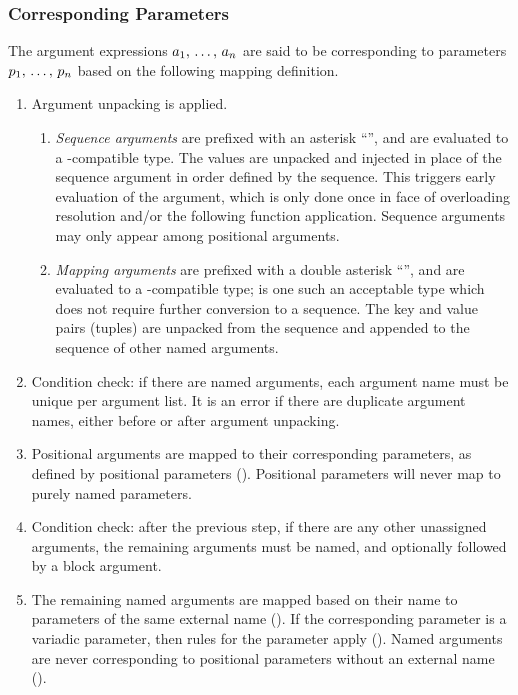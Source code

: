 \subsubsection{Corresponding Parameters}
\label{sec:corresponding-parameters}

The argument expressions $a_1 ,\, \ldots ,\, a_n$ are said to be corresponding to parameters $p_1 ,\, \ldots ,\, p_n$ based on the following mapping definition. 

\begin{enumerate}
  \item Argument unpacking is applied. 
    \begin{enumerate}
      \item {\em Sequence arguments} are prefixed with an asterisk ``\code{*}'', and are evaluated to a -compatible type. The values are unpacked and injected in place of the sequence argument in order defined by the sequence. This triggers early evaluation of the argument, which is only done once in face of overloading resolution and/or the following function application. Sequence arguments may only appear among positional arguments. 
      \item {\em Mapping arguments} are prefixed with a double asterisk ``\code{**}'', and are evaluated to a -compatible type;  is one such an acceptable type which does not require further conversion to a sequence. The key and value pairs (tuples) are unpacked from the sequence and appended to the sequence of other named arguments. 
    \end{enumerate}
    
  \item Condition check: if there are named arguments, each argument name must be unique per argument list. It is an error if there are duplicate argument names, either before or after argument unpacking.
    
  \item Positional arguments are mapped to their corresponding parameters, as defined by positional parameters (). Positional parameters will never map to purely named parameters. 
  
  \item Condition check: after the previous step, if there are any other unassigned arguments, the remaining arguments must be named, and optionally followed by a block argument. 
  
  \item The remaining named arguments are mapped based on their name to parameters of the same external name (). If the corresponding parameter is a variadic parameter, then rules for the parameter apply (). Named arguments are never corresponding to positional parameters without an external name (). 
  

\end{enumerate}
